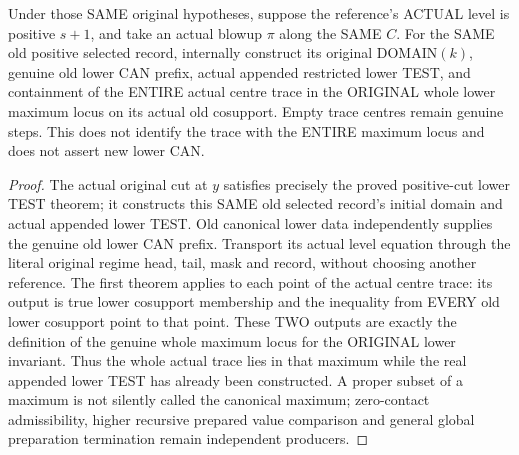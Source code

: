 \begin{theorem}
\label{hir:original-positive-stepone-inherited-lower-max-cut}
\leanok
Under those SAME original hypotheses, suppose the reference's ACTUAL level
is positive $s+1$, and take an actual blowup $\pi$ along the SAME $C$.
For the SAME old positive selected record, internally construct its original
DOMAIN$(k)$, genuine old lower CAN prefix, actual appended restricted lower
TEST, and containment of the ENTIRE actual centre trace in the ORIGINAL
whole lower maximum locus on its actual old cosupport. Empty trace centres
remain genuine steps. This does not identify the trace with the ENTIRE
maximum locus and does not assert new lower CAN.
\end{theorem}
\begin{proof}
The actual original cut at $y$ satisfies precisely the proved positive-cut
lower TEST theorem; it constructs this SAME old selected record's initial
domain and actual appended lower TEST. Old canonical lower data independently
supplies the genuine old lower CAN prefix. Transport its actual level
equation through the literal original regime head, tail, mask and record,
without choosing another reference. The first theorem applies to each point
of the actual centre trace: its output is true lower cosupport membership
and the inequality from EVERY old lower cosupport point to that point.
These TWO outputs are exactly the definition of the genuine whole maximum
locus for the ORIGINAL lower invariant. Thus the whole actual trace lies in
that maximum while the real appended lower TEST has already been constructed.
A proper subset of a maximum is not silently called the canonical maximum;
zero-contact admissibility, higher recursive prepared value comparison and
general global preparation termination remain independent producers.
\end{proof}

